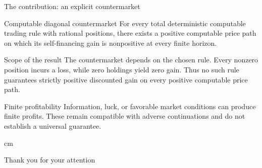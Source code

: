 \documentclass{beamer}
\begin{document}
\begin{frame}{The contribution: an explicit countermarket}
\small
\begin{block}{Computable diagonal countermarket}
For every total deterministic computable trading rule with rational positions,
there exists a positive computable price path on which its self-financing
gain is nonpositive at every finite horizon.
\end{block}
\begin{alertblock}{Scope of the result}
The countermarket depends on the chosen rule. Every nonzero position incurs
a loss, while zero holdings yield zero gain. Thus no such rule guarantees
strictly positive discounted gain on every positive computable price path.
\end{alertblock}
\begin{exampleblock}{Finite profitability}
Information, luck, or favorable market conditions can produce finite profits.
These remain compatible with adverse continuations and do not establish
a universal guarantee.
\end{exampleblock}
\vfill
\end{frame}


\begin{frame}
 cm
\begin{center}
\Large\color{blue}Thank you for your attention
\end{center}
\end{frame}
\end{document}
